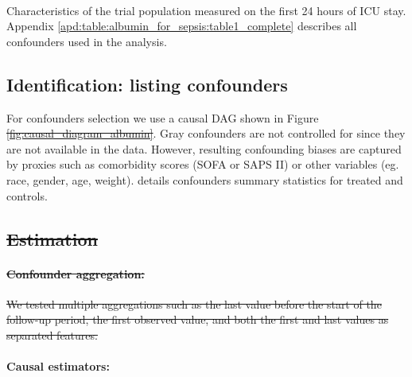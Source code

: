 \documentclass[10pt,letterpaper]{article}
\providecommand{\DIFdeltex}[1]{{\protect\color{red}\sout{#1}}}                      %
\providecommand{\DIFaddbegin}{} %
\providecommand{\DIFaddend}{} %
\providecommand{\DIFdelbegin}{} %
\providecommand{\DIFdelend}{} %
\providecommand{\DIFdel}[1]{\texorpdfstring{\DIFdeltex{#1}}{}} %
\newcommand{\DIFscaledelfig}{0.5}
\newlength{\DIFdelgraphicswidth} %
\newlength{\DIFdelgraphicsheight} %
\newcommand{\DIFaddincludegraphics}[2][]{{\color{blue}\fbox{\DIFOincludegraphics[#1]{#2}}}} %
\newcommand{\DIFdelincludegraphics}[2][]{%
\sbox{\DIFdelgraphicsbox}{\DIFOincludegraphics[#1]{#2}}%
\settoboxwidth{\DIFdelgraphicswidth}{\DIFdelgraphicsbox} %
\settoboxtotalheight{\DIFdelgraphicsheight}{\DIFdelgraphicsbox} %
\scalebox{\DIFscaledelfig}{%
\parbox[b]{\DIFdelgraphicswidth}{\usebox{\DIFdelgraphicsbox}\\[-\baselineskip] \rule{\DIFdelgraphicswidth}{0em}}\llap{\resizebox{\DIFdelgraphicswidth}{\DIFdelgraphicsheight}{%
\setlength{\unitlength}{\DIFdelgraphicswidth}%
\begin{picture}(1,1)%
\thicklines\linethickness{2pt} %
{\color[rgb]{1,0,0}\put(0,0){\framebox(1,1){}}}%
{\color[rgb]{1,0,0}\put(0,0){\line( 1,1){1}}}%
{\color[rgb]{1,0,0}\put(0,1){\line(1,-1){1}}}%
\end{picture}%
}\hspace*{3pt}}} %
} %
\DeclareRobustCommand{\DIFaddbegin}{\DIFOaddbegin \let\includegraphics\DIFaddincludegraphics} %
\DeclareRobustCommand{\DIFaddend}{\DIFOaddend \let\includegraphics\DIFOincludegraphics} %
\DeclareRobustCommand{\DIFdelbegin}{\DIFOdelbegin \let\includegraphics\DIFdelincludegraphics} %
\DeclareRobustCommand{\DIFdelend}{\DIFOaddend \let\includegraphics\DIFOincludegraphics} %
\begin{document}
\begin{table}[h!]
  \centering\small
  \resizebox{\columnwidth}{!}{
  }
  \\[.5ex]

  \caption{Characteristics of the trial population measured on the first 24
    hours of ICU stay. Appendix \ref{apd:table:albumin_for_sepsis:table1_complete}
    describes all confounders used in the analysis.}\label{table:albumin_for_sepsis:table1_simple}
\end{table}


\subsection*{Identification: listing confounders}\label{sec:identification_mimic_iv}

For confounders selection we use a causal DAG shown in Figure
\DIFdelbegin \DIFdel{\ref{fig:causal_diagram_albumin}}\DIFdelend \DIFaddbegin {}\DIFaddend . Gray confounders are not controlled for since
they are not available in the data. However, resulting confounding biases are
captured by proxies such as comorbidity scores (SOFA or SAPS II) or other
variables (eg. race, gender, age, weight).
%
 details confounders
summary statistics for treated and controls.


\DIFdelbegin \subsection*{\DIFdel{Estimation}}%

\paragraph{\DIFdel{Confounder aggregation:}}
\addtocounter{paragraph}{-1}%

\DIFdel{We tested multiple aggregations such as the last value before the start of the
  follow-up period, the first observed value, and both the first and last values as
  separated features.
}%

\DIFdelend \paragraph{Causal estimators:}
\end{document}
